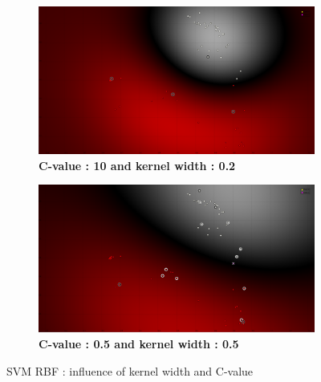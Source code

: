 \begin{figure}[!ht]
\begin{subfigure}[h]{0.31\textwidth}
\includegraphics[height=0.11\textheight]{./classification/SVM_rbf_w_0_2_c_10_TR_25_.png}
\caption{\bf C-value : 10 and kernel width : 0.2}
\label{fig:SVM_rbf_w_0_2_c_10_TR_25_}
\end{subfigure}
\hspace{20mm}
\begin{subfigure}[h]{0.31\textwidth}
\includegraphics[height=0.11\textheight]{./classification/SVM_rbf_w_0_5_c_0_5_TR_25_.png}
\caption{\bf C-value : 0.5 and kernel width : 0.5}
\label{fig:SVM_rbf_w_0_5_c_0_5_TR_25_}
\end{subfigure}

\caption{SVM RBF : influence of kernel width and C-value}
\label{fig:SVM_RBF}
\end{figure}




